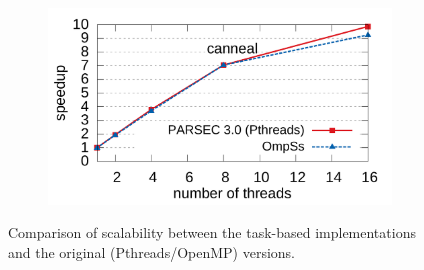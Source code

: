 \begin{figure}[p]
				\begin{subfigure}[b]{0.8\textwidth}
                \includegraphics[width=\textwidth]{task_benchmarks/figures/canneal_scale}
                \label{fig:canneal_scale}
        \end{subfigure}
      \caption{Comparison of scalability between the task-based implementations and the original (Pthreads/OpenMP) versions.}
			\label{fig:scalability_graphs_1}
\end{figure}

